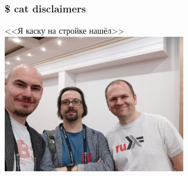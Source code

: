 \begin{frame}
  \frametitle{\$ cat disclaimers}
  \begin{center}
    \Large <<Я каску на стройке нашёл>>\\
    \vspace{2mm}
    \includegraphics[width=8cm,keepaspectratio]{./images/arrested.png}
  \end{center}
\end{frame}

